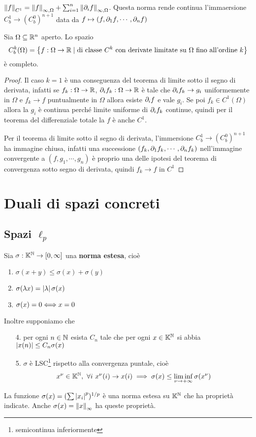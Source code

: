 $\left\Vert{f}\right\Vert_{C^1}=\left\Vert{f}\right\Vert_{\infty,\Omega}+\sum_{i=1}^n\left\Vert{\partial_i f}\right\Vert_{\infty,\Omega}$. Questa norma rende continua l'immaersione $C^1_b\to (C_b^0)^{n+1}$ data da $f\mapsto(f,\partial_1f,\cdots,\partial_n f)$

\begin{proposition}
Sia $\Omega\subseteq \mathbb{R}^n$ aperto. Lo spazio 
\[C^k_b(\Omega)=\left\{{f:\Omega\to\mathbb{R}\mid \text{di classe $C^k$ con derivate limitate su $\Omega$ fino all'ordine $k$}}\right\}\]
\`e completo.
\end{proposition}
\begin{proof}
Il caso $k=1$ \`e una conseguenza del teorema di limite sotto il segno di derivata, infatti se $f_k:\Omega\to \mathbb{R}$, $\partial_i f_k:\Omega\to\mathbb{R}$ \`e tale che $\partial_i f_k\to g_i$ uniformemente in $\Omega$ e $f_k\to f$ puntualmente in $\Omega$ allora esiste $\partial_i f$ e vale $g_i$. Se poi $f_k\in C^1(\Omega)$ allora la $g_i$ \`e continua perch\'e limite uniforme di $\partial_i f_k$ continue, quindi per il teorema del differenziale totale la $f$ \`e anche $C^1$.

Per il teorema di limite sotto il segno di derivata, l'immersione $C^1_b\to (C_b^0)^{n+1}$ ha immagine chiusa, infatti una successione $(f_k,\partial_1f_k,\cdots,\partial_nf_k)$ nell'immagine convergente a $(f,g_1,\cdots, g_n)$ \`e proprio una delle ipotesi del teorema di convergenza sotto segno di derivata, quindi $f_k\to f$ in $C^1$
\end{proof}

\section{Duali di spazi concreti}
\subsection{Spazi \texorpdfstring{$\ell_p$}{lp}}
\begin{definition}
Sia $\sigma:\mathbb{K}^{\mathbb{N}}\to [0,\infty]$ una \textbf{norma estesa}, cio\`e
\begin{enumerate}
    \item $\sigma(x+y)\leq \sigma(x)+\sigma(y)$
    \item $\sigma(\lambda x)=\left|{\lambda}\right|\sigma(x)$
    \item $\sigma(x)=0\Longleftrightarrow x=0$
\end{enumerate}
\end{definition}
\noindent
Inoltre supponiamo che 
\begin{enumerate}
    \item[4.] per ogni $n\in\mathbb{N}$ esista $C_n$ tale che per ogni $x\in\mathbb{K}^{\mathbb{N}}$ si abbia $\left|{x(n)}\right|\leq C_n\sigma(x)$
    \item[5.] $\sigma$ \`e LSC\footnote{semicontinua inferiormente} rispetto alla convergenza puntale, cio\`e
    \[x^\nu\in \K^\N,\ \forall i\ x^\nu(i)\to x(i)\implies \sigma(x)\leq \liminf_{\nu\to+\infty}\sigma(x^\nu)\]
\end{enumerate}
\begin{example}
La funzione $\sigma(x)=(\sum\left|{x_i}\right|^p)^{1/p}$ \`e una norma estesa su $\mathbb{K}^{\mathbb{N}}$ che ha propriet\`a indicate. Anche $\sigma(x)=\left\Vert{x}\right\Vert_\infty$ ha queste propriet\`a.
\end{example}

